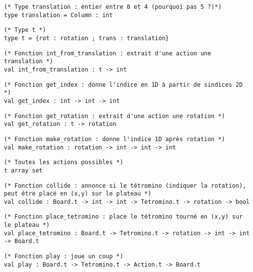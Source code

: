 \documentclass{article}
\begin{document}
\begin{lstlisting}[frame=L]
(* Type translation : entier entre 0 et 4 (pourquoi pas 5 ?)*)
type translation = Column : int
\end{lstlisting}

\begin{lstlisting}[frame=L]
(* Type t *)
type t = {rot : rotation ; trans : translation}
\end{lstlisting}

\begin{lstlisting}[frame=L]
(* Fonction int_from_translation : extrait d'une action une translation *)
val int_from_translation : t -> int
\end{lstlisting}

\begin{lstlisting}[frame=L]
(* Fonction get_index : donne l'indice en 1D à partir de sindices 2D *)
val get_index : int -> int -> int
\end{lstlisting}

\begin{lstlisting}[frame=L]
(* Fonction get_rotation : extrait d'une action une rotation *)
val get_rotation : t -> rotation
\end{lstlisting}

\begin{lstlisting}[frame=L]
(* Fonction make_rotation : donne l'indice 1D après rotation *)
val make_rotation : rotation -> int -> int -> int
\end{lstlisting}

\begin{lstlisting}[frame=L]
(* Toutes les actions possibles *)
t array set
\end{lstlisting}

\begin{lstlisting}[frame=L]
(* Fonction collide : annonce si le tétromino (indiquer la rotation), peut être placé en (x,y) sur le plateau *)
val collide : Board.t -> int -> int -> Tetromino.t -> rotation -> bool
\end{lstlisting}

\begin{lstlisting}[frame=L]
(* Fonction place_tetromino : place le tétromino tourné en (x,y) sur le plateau *)
val place_tetromino : Board.t -> Tetromino.t -> rotation -> int -> int -> Board.t
\end{lstlisting}

\begin{lstlisting}[frame=L]
(* Fonction play : joue un coup *)
val play : Board.t -> Tetromino.t -> Action.t -> Board.t
\end{lstlisting}
\end{document}
